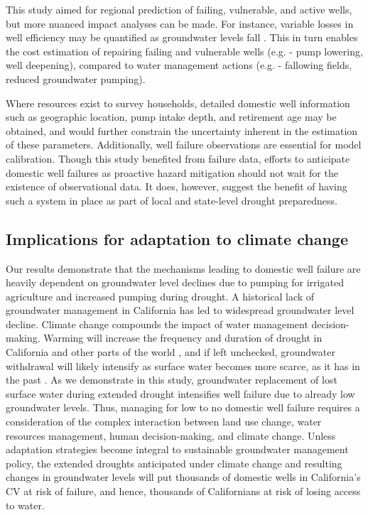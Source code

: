 This study aimed for regional prediction of failing, vulnerable, and active wells, but more nuanced impact analyses can be made. For instance, variable losses in well efficiency may be quantified as groundwater levels fall \citep{Medellin-azuara2016}. This in turn enables the cost estimation of repairing failing and vulnerable wells (e.g. - pump lowering, well deepening), compared to water management actions (e.g. - fallowing fields, reduced groundwater pumping).  

Where resources exist to survey households, detailed domestic well information such as geographic location, pump intake depth, and retirement age may be obtained, and would further constrain the uncertainty inherent in the estimation of these parameters. Additionally, well failure observations are essential for model calibration. Though this study benefited from failure data, efforts to anticipate domestic well failures as proactive hazard mitigation should not wait for the existence of observational data. It does, however, suggest the benefit of having such a system in place as part of local and state-level drought preparedness.  

\subsection{Implications for adaptation to climate change}

Our results demonstrate that the mechanisms leading to domestic well failure are heavily dependent on groundwater level declines due to pumping for irrigated agriculture and increased pumping during drought. A historical lack of groundwater management in California \citep{Hanak2011} has led to widespread groundwater level decline. Climate change compounds the impact of water management decision-making. Warming will increase the frequency and duration of drought in California and other parts of the world \citep{Diffenbaugh2015, Cook2015, Swain2018, Rhoades2018, VanLoon2016}, and if left unchecked, groundwater withdrawal will likely intensify as surface water becomes more scarce, as it has in the past \citep{Hanak2011}. As we demonstrate in this study, groundwater replacement of lost surface water during extended drought intensifies well failure due to already low groundwater levels. Thus, managing for low to no domestic well failure requires a consideration of the complex interaction between land use change, water resources management, human decision-making, and climate change. Unless adaptation strategies become integral to sustainable groundwater management policy, the extended droughts anticipated under climate change and resulting changes in groundwater levels will put thousands of domestic wells in California's CV at risk of failure, and hence, thousands of Californians at risk of losing access to water.  


